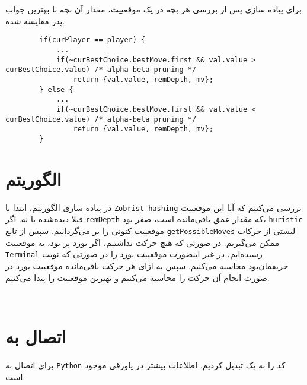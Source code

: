 \section{}
برای پیاده سازی
پس از بررسی هر بچه در یک موقعییت، مقدار آن بچه با بهترین جواب پدر مقایسه شده.

\begin{latin}
\begin{lstlisting}
		if(curPlayer == player) {
			...
			if(~curBestChoice.bestMove.first && val.value > curBestChoice.value) /* alpha-beta pruning */
				return {val.value, remDepth, mv};
		} else {
			...
			if(~curBestChoice.bestMove.first && val.value < curBestChoice.value) /* alpha-beta pruning */
				return {val.value, remDepth, mv};
		}

\end{lstlisting}
\end{latin}

\section{الگوریتم}
در پیاده سازی الگوریتم، ابتدا با
\verb;Zobrist hashing;
 بررسی می‌کنیم که آیا این  موقعییت قبلا دیده‌شده یا نه.
 اگر
 \verb;remDepth;
 که مقدار عمق باقی‌مانده است، صفر بود، 
 \verb;huristic;
 موقعییت کنونی را بر می‌گردانیم.
 سپس از تابع 
 \verb;getPossibleMoves;
 لیستی از حرکات ممکن می‌گیریم.
 در صورتی که هیچ حرکت نداشتیم، اگر بورد پر بود، به  موقعییت
 \verb;Terminal;
 رسیده‌ایم، در غیر اینصورت موقعییت بورد را در صورتی که نوبت حریفمان‌بود محاسبه می‌کنیم.
 سپس به ازای هر حرکت باقی‌مانده موقعییت بورد در صورت انجام آن حرکت را محاسبه می‌کنیم و بهترین موقعییت را پیدا می‌کنیم.
 
 \begin{latin}
 \begin{lstlisting}
 
 \end{lstlisting}
 \end{latin}
 
 \section{اتصال به }
 
 برای اتصال به 
 \verb;Python;
 کد را به یک
 تبدیل کردیم.
 اطلاعات بیشتر در پاورقی موجود است.

